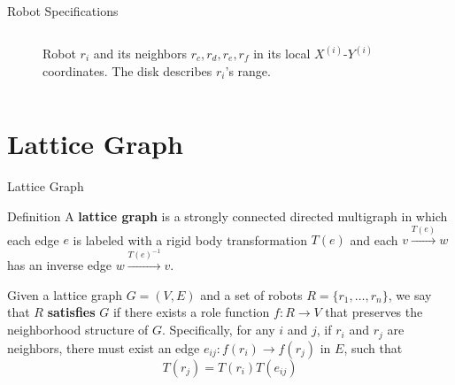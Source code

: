 \documentclass[10pt]{beamer}
\newcommand{\edge}[3]{{#1}\overset{#2}{\longrightarrow}{#3}}
\begin{document}
\begin{frame}{Robot Specifications}{}
\begin{block}{}
\begin{columns}[T]
\begin{column}{.4\textwidth}
\begin{figure}
          \caption{Robot $r_i$ and its neighbors $r_c, r_d, r_e,
            r_f$ in its local $X^{(i)}$-$Y^{(i)}$ coordinates. The
            disk describes $r_i$'s range.}
          \label{fig:robotmodel}
        \end{figure}
      \end{column}%
    \end{columns}
\end{block}
\end{frame}

\section{Lattice Graph}
\begin{frame}{Lattice Graph}
  \begin{block}{}
    \begin{bclogo}[couleur=orange!10, arrondi=0.2, ombre=true]{Definition}
      A \textbf{lattice graph} is a strongly connected directed
      multigraph in which each edge $e$ is labeled with a rigid body
      transformation $T(e)$ and each $\edge{v}{T(e)}{w}$ has an
      inverse edge $\edge{w}{T(e)^{-1}}{v}$.  
    \end{bclogo}
    \begin{bclogo}[couleur=orange!10, arrondi=0.2, ombre=true]{} 
      Given a lattice graph $G=(V, E)$ and a set of robots $R = \{
      r_1, \ldots, r_n \}$, we say that $R$ \textbf{satisfies} $G$ if
      there exists a role function $f: R \rightarrow V$ that preserves
      the neighborhood structure of $G$.
      Specifically, for any $i$ and $j$, if $r_i$ and $r_j$ are neighbors, 
      there must exist an edge
      $e_{ij}: \edge{f(r_i)}{}{f(r_j)}$ in $E$, such that
      $$ T(r_j) = T(r_i) T(e_{ij})$$
    \end{bclogo}
  \end{block}
\end{frame}
\end{document}
